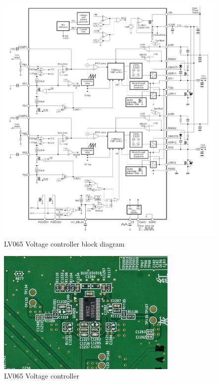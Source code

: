 \documentclass[11pt,a4paper,titlepage]{article}
\begin{document}
		  \begin{figure}[htbp]
					\centering
				  \includegraphics[width = \textwidth]{LV5065_block_diag.png}
				  \caption{LV065 Voltage controller block diagram}
				  \label{fig:LV5065bd}
			\end{figure}
		  \begin{figure}[htbp]
				\centering
				\includegraphics[width =.6\textwidth]{LV5065.png}
				\caption{LV065 Voltage controller}
				\label{fig:LV5065}
		  \end{figure}
\end{document}
